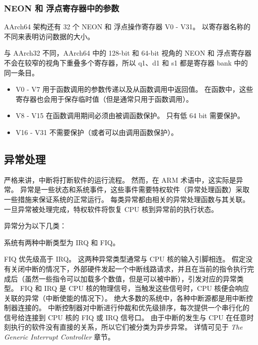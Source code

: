 \subsubsection{NEON 和 浮点寄存器中的参数}

AArch64 架构还有 32 个 NEON 和 浮点操作寄存器 V0 - V31。
以寄存器名称的不同来表明访问数据的大小。

\begin{Tcbox}[title={Note}]
  与 AArch32 不同，AArch64 中的 128-bit 和 64-bit 视角的 NEON 和 浮点寄存器不会在较窄的视角下重叠多个寄存器，所以 q1、d1 和 s1 都是寄存器 bank 中的同一条目。
\end{Tcbox}


\begin{itemize}
  \item V0 - V7 用于函数调用的参数传递以及从函数调用中返回值。
    在函数中，这些寄存器也会用于保存临时值（但是通常只用于函数调用）。
  \item V8 - V15 在函数调用期间必须由被调函数保护。
    只有低 64 bit 需要保护。
  \item V16 - V31 不需要保护（或者可以由调用函数保护）。
\end{itemize}

\subsection{异常处理} \label{sec:exception}

严格来讲，中断将打断软件的运行流程。
然而，在 ARM 术语中，这实际是异常。
异常是一些状态和系统事件，这些事件需要特权软件（异常处理函数）采取一些措施来保证系统的正常运行。
每类异常都由相关的异常处理函数与其关联。
一旦异常被处理完成，特权软件将恢复 CPU 核到异常前的执行状态。

异常分为以下几类：


系统有两种中断类型为 IRQ 和 FIQ。

FIQ 优先级高于 IRQ。
这两种异常类型通常与 CPU 核的输入引脚相连。
假定没有关闭中断的情况下，外部硬件发起一个中断线路请求，并且在当前的指令执行完成后（虽然一些指令可以加载多个数值，但是可以被中断），引发对应的异常类型。
FIQ 和 IRQ 是 CPU 核的物理信号，当触发这些信号时，CPU 核便会响应关联的异常（中断使能的情况下）。
绝大多数的系统中，各种中断源都是用中断控制器连接的。
中断控制器对中断进行仲裁和优先级排序，每次提供一个串行化的信号给连接到 CPU 核的 FIQ 或 IRQ 信号口。
由于中断的发生与 CPU 在任意时刻执行的软件没有直接的关系，所以它们被分类为异步异常。
详情可见于 \textit{The Generic Interrupt Controller} 章节。

